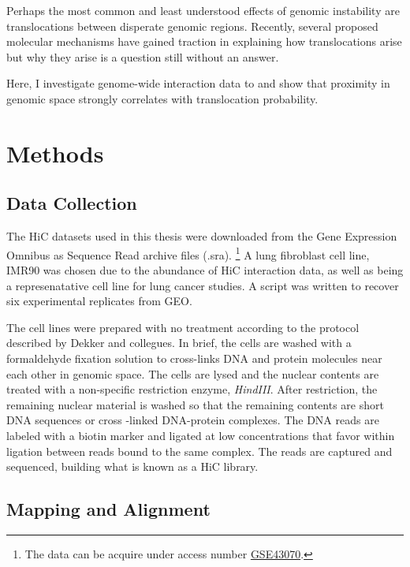 \documentclass[phd,tocprelim]{cornell}
\begin{document}
Perhaps the most common and least understood effects of genomic instability are
translocations between disperate genomic regions.  Recently, several proposed
molecular mechanisms have gained traction in explaining how translocations arise
but why they arise is a question still without an answer.

Here, I investigate genome-wide interaction data to and show that proximity in
genomic space strongly correlates with translocation probability.


\chapter{Methods}

\section{Data Collection}

The HiC datasets used in this thesis were downloaded from the Gene
Expression Omnibus as Sequence Read archive files (.sra).
  \footnote{
    The data can be acquire under access number
    \href{http://www.ncbi.nlm.nih.gov/geo/query/acc.cgi?acc=GSE43070}
    {GSE43070}.\cite{Ren2013}
  }
A lung fibroblast cell line, IMR90 was chosen due to the abundance of
HiC interaction data, as well as being a represenatative cell line
for lung cancer studies.  A script was written to recover six experimental
replicates from GEO.

The cell lines were prepared with no treatment according to the protocol
described by Dekker and collegues\cite{Dekker2013}.  In brief, the cells
are washed with a formaldehyde fixation solution to cross-links
DNA and protein molecules near each other in genomic space.  The cells are
lysed and the nuclear contents are treated with a non-specific restriction
enzyme, \textit{HindIII}.  After restriction, the remaining nuclear material
is washed so that the remaining contents are short DNA sequences or cross
-linked DNA-protein complexes.  The DNA reads are labeled with a biotin
marker and ligated at low concentrations that favor within ligation between
reads bound to the same complex.  The reads are captured and sequenced,
building what is known as a HiC library.





\section{Mapping and Alignment}
\end{document}
